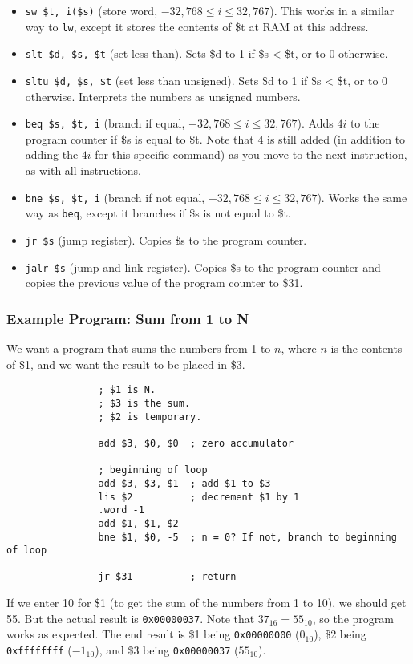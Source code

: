 \documentclass[]{article}
\theoremstyle{definition}
\begin{document}
\begin{itemize}
				\item \verb+sw $t, i($s)+ (store word, $-32,768 \le i \le 32,767$). This works in a similar way to \verb+lw+, except it stores the contents of \$t at RAM at this address.
				\item \verb+slt $d, $s, $t+ (set less than). Sets \$d to 1 if \$s < \$t, or to 0 otherwise.
				\item \verb+sltu $d, $s, $t+ (set less than unsigned). Sets \$d to 1 if \$s < \$t, or to 0 otherwise. Interprets the numbers as unsigned numbers.
				\item \verb+beq $s, $t, i+ (branch if equal, $-32,768 \le i \le 32,767$). Adds $4i$ to the program counter if \$s is equal to \$t. Note that 4 is still added (in addition to adding the $4i$ for this specific command) as you move to the next instruction, as with all instructions. 
				\item \verb+bne $s, $t, i+ (branch if not equal, $-32,768 \le i \le 32,767$). Works the same way as \verb+beq+, except it branches if \$s is not equal to \$t.
				\item \verb+jr $s+ (jump register). Copies \$s to the program counter.
				\item \verb+jalr $s+ (jump and link register). Copies \$s to the program counter and copies the previous value of the program counter to \$31.
			\end{itemize}
		\subsubsection{Example Program: Sum from 1 to N}
			We want a program that sums the numbers from 1 to $n$, where $n$ is the contents of \$1, and we want the result to be placed in \$3. 
			\begin{verbatim}
				; $1 is N.
				; $3 is the sum.
				; $2 is temporary.

				add $3, $0, $0  ; zero accumulator

				; beginning of loop
				add $3, $3, $1  ; add $1 to $3
				lis $2          ; decrement $1 by 1
				.word -1
				add $1, $1, $2
				bne $1, $0, -5  ; n = 0? If not, branch to beginning of loop

				jr $31          ; return
			\end{verbatim}
			If we enter 10 for \$1 (to get the sum of the numbers from 1 to 10), we should get 55. But the actual result is \verb+0x00000037+. Note that $37_{16} = 55_{10}$, so the program works as expected. The end result is \$1 being \verb+0x00000000+ ($0_{10}$), \$2 being \verb+0xffffffff+ ($-1_{10}$), and \$3 being \verb+0x00000037+ ($55_{10}$).
\end{document}
